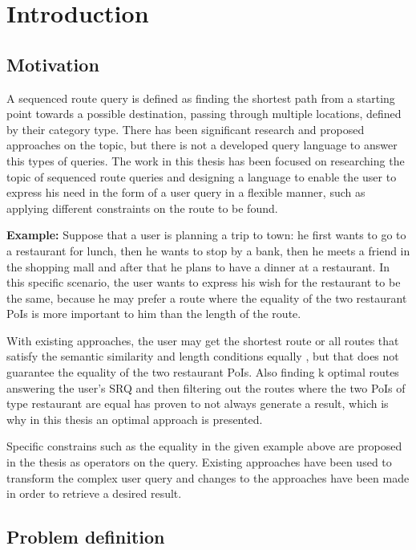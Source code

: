 \chapter{Introduction}
\label{sec:intro}

\section{Motivation}
A sequenced route query is defined as finding the shortest path from a starting point towards a possible destination, passing through multiple locations, defined by their category type. There has been significant research and proposed approaches on the topic, but there is not a developed query language to answer this types of queries. The work in this thesis has been focused on researching the topic of sequenced route queries and designing a language to enable the user to express his need in the form of a user query in a flexible manner, such as applying different constraints on the route to be found.

\textbf{Example:}
Suppose that a user is planning a trip to town: he first wants to go to a restaurant for lunch, then he wants to stop by a bank, then he meets a friend in the shopping mall and after that he plans to have a dinner at a restaurant. In this specific scenario, the user wants to express his wish for the restaurant to be the same, because he may prefer a route where the equality of the two restaurant PoIs is more important to him than the length of the route.

With existing approaches, the user may get the shortest route \cite{OSR} or all routes that satisfy the semantic similarity and length conditions equally \cite{semanticSRQ}, but that does not guarantee the equality of the two restaurant PoIs. Also finding k optimal routes answering the user's SRQ and then filtering out the routes where the two PoIs of type restaurant are equal has proven to not always generate a result, which is why in this thesis an optimal approach is presented.

Specific constrains such as the equality in the given example above are proposed in the thesis as operators on the query. Existing approaches have been used to transform the complex user query and changes to the approaches have been made in order to retrieve a desired result. 

\section{Problem definition}

